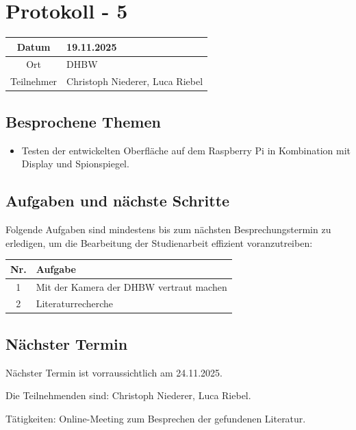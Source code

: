 \chapter{Protokoll - 5}

\begin{table}[H]
    \centering
    \begin{tabular}{|c|l|}
        \hline
        Datum& 19.11.2025 \\
        \hline
        Ort& DHBW\\
        \hline
        Teilnehmer& Christoph Niederer, Luca Riebel\\
        \hline
    \end{tabular}
\end{table}

\section{Besprochene Themen}
\begin{itemize}
    \item Testen der entwickelten Oberfläche auf dem Raspberry Pi in Kombination mit Display und Spionspiegel.
\end{itemize}

\section{Aufgaben und nächste Schritte}
Folgende Aufgaben sind mindestens bis zum nächsten Besprechungstermin zu erledigen, um die Bearbeitung der Studienarbeit effizient voranzutreiben:

\begin{table}[H]
    \centering
    \begin{tabular}{|c|p{12cm}|}
        \hline
        \textbf{Nr.} & \textbf{Aufgabe}\\
        \hline
        1 & Mit der Kamera der DHBW vertraut machen\\
        \hline
        2 & Literaturrecherche\\
        \hline
    \end{tabular}
\end{table}

\section{Nächster Termin}
Nächster Termin ist vorraussichtlich am 24.11.2025.

Die Teilnehmenden sind: Christoph Niederer, Luca Riebel. 

Tätigkeiten: Online-Meeting zum Besprechen der gefundenen Literatur.